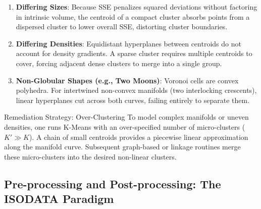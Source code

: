 \begin{enumerate}
    \item \textbf{Differing Sizes}: Because SSE penalizes squared deviations without factoring in intrinsic volume, the centroid of a compact cluster absorbs points from a dispersed cluster to lower overall SSE, distorting cluster boundaries.
    \item \textbf{Differing Densities}: Equidistant hyperplanes between centroids do not account for density gradients. A sparse cluster requires multiple centroids to cover, forcing adjacent dense clusters to merge into a single group.
    \item \textbf{Non-Globular Shapes (e.g., Two Moons)}: Voronoi cells are convex polyhedra. For intertwined non-convex manifolds (two interlocking crescents), linear hyperplanes cut across both curves, failing entirely to separate them.
\end{enumerate}

\begin{noteblock}{Remediation Strategy: Over-Clustering}
To model complex manifolds or uneven densities, one runs K-Means with an over-specified number of micro-clusters ($K' \gg K$). A chain of small centroids provides a piecewise linear approximation along the manifold curve. Subsequent graph-based or linkage routines merge these micro-clusters into the desired non-linear clusters.
\end{noteblock}

\subsection{Pre-processing and Post-processing: The ISODATA Paradigm}

